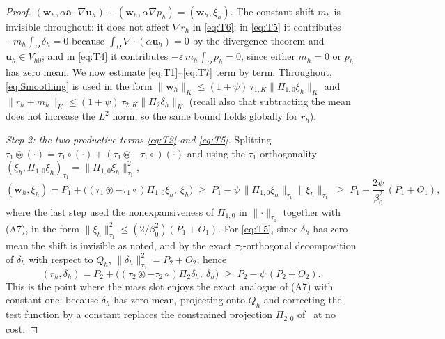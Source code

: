 \documentclass[11pt]{article}
\theoremstyle{remark}
\newcommand{\bu}{\boldsymbol{u}}
\newcommand{\bw}{\boldsymbol{w}}
\newcommand{\ba}{\boldsymbol{a}}
\newcommand{\norm}[1]{\lVert #1 \rVert}
\newcommand{\normK}[1]{\lVert #1 \rVert_{K}}
\newcommand{\smul}{\circledast}
\newcommand{\pmul}{\circ}
\newcommand{\Ptwo}{\Pi_{2}}
\newcommand{\Ponez}{\Pi_{1,0}}
\begin{document}
\begin{proof}
$(\bw_h, \alpha\ba\cdot\nabla\bu_h) + (\bw_h, \alpha\nabla p_h) = (\bw_h, \xi_h)$.
The constant shift $m_h$ is invisible throughout: it does not affect $\nabla r_h$ in
\cref{eq:T6}; in \cref{eq:T5} it contributes $-m_h\int_\Omega \delta_h = 0$ because
$\int_\Omega \nabla\cdot(\alpha\bu_h) = 0$ by the divergence theorem and
$\bu_h \in V_{h0}$; and in \cref{eq:T4} it contributes
$-\varepsilon\, m_h \int_\Omega p_h = 0$, since either $m_h = 0$ or $p_h$ has zero
mean. We now estimate \cref{eq:T1}--\cref{eq:T7} term by term. Throughout,
\cref{eq:Smoothing} is used in the form
$\normK{\bw_h} \le (1+\psi)\,\tau_{1,K}\normK{\Ponez\xi_h}$ and
$\normK{r_h + m_h} \le (1+\psi)\,\tau_{2,K}\normK{\Ptwo\delta_h}$ (recall also that
subtracting the mean does not increase the $L^2$ norm, so the same bound holds
globally for $r_h$).

\medskip\noindent\emph{Step 2: the two productive terms \cref{eq:T2} and \cref{eq:T5}.}
Splitting $\tau_1\smul(\cdot) = \tau_1\pmul(\cdot) + (\tau_1\smul - \tau_1\pmul)(\cdot)$
and using the $\tau_1$-orthogonality
$(\xi_h, \Ponez\xi_h)_{\tau_1} = \norm{\Ponez\xi_h}_{\tau_1}^2$,
\[
  (\bw_h, \xi_h)
  = P_1 + \bigl((\tau_1\smul - \tau_1\pmul)\Ponez\xi_h,\ \xi_h\bigr)
  \;\ge\; P_1 - \psi\,\norm{\Ponez\xi_h}_{\tau_1}\norm{\xi_h}_{\tau_1}
  \;\ge\; P_1 - \frac{2\psi}{\beta_0^2}\,(P_1 + O_1),
\]
where the last step used the nonexpansiveness of $\Ponez$ in $\norm{\cdot}_{\tau_1}$
together with \textup{(A7)}, in the form
$\norm{\xi_h}_{\tau_1}^2 \le (2/\beta_0^2)(P_1 + O_1)$. For \cref{eq:T5}, since
$\delta_h$ has zero mean the shift is invisible as noted, and by the exact
$\tau_2$-orthogonal decomposition of $\delta_h$ with respect to $Q_h$,
$\norm{\delta_h}_{\tau_2}^2 = P_2 + O_2$; hence
\[
  (r_h, \delta_h)
  = P_2 + \bigl((\tau_2\smul - \tau_2\pmul)\Ptwo\delta_h,\ \delta_h\bigr)
  \;\ge\; P_2 - \psi\,(P_2 + O_2).
\]
This is the point where the mass slot enjoys the exact analogue of \textup{(A7)} with
constant one: because $\delta_h$ has zero mean, projecting onto $Q_h$ and correcting
the test function by a constant replaces the constrained projection
$\Pi_{2,0}$ of~\cite{Codina2008} at no cost.


\end{proof}
\end{document}
